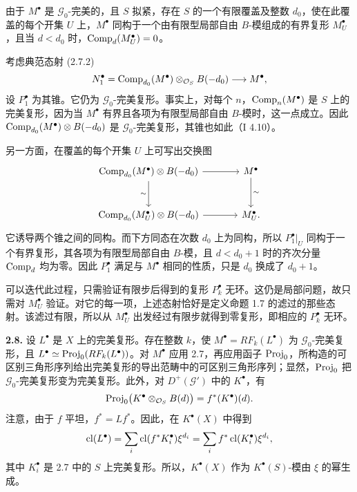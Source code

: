 由于 \(M^\bullet\) 是 \(\mathcal G_0\)-完美的，且 \(S\) 拟紧，存在 \(S\) 的一个有限覆盖及整数 \(d_0\)，使在此覆盖的每个开集 \(U\) 上，\(M^\bullet\) 同构于一个由有限型局部自由 \(B\)-模组成的有界复形 \(M_U^\bullet\)，且当 \(d<d_0\) 时，\(\operatorname{Comp}_d(M_U^\bullet)=0\)。

考虑典范态射 (2.7.2)
\[
 N_1^\bullet=\operatorname{Comp}_{d_0}(M^\bullet)\otimes_{\mathcal O_S}B(-d_0)
 \longrightarrow M^\bullet,
\]
设 \(P_1^\bullet\) 为其锥。它仍为 \(\mathcal G_0\)-完美复形。事实上，对每个 \(n\)，\(\operatorname{Comp}_n(M^\bullet)\) 是 \(S\) 上的完美复形，因为当 \(M^\bullet\) 有界且各项为有限型局部自由 \(B\)-模时，这一点成立。因此 \(\operatorname{Comp}_{d_0}(M^\bullet)\otimes B(-d_0)\) 是 \(\mathcal G_0\)-完美复形，其锥也如此（I 4.10）。

另一方面，在覆盖的每个开集 \(U\) 上可写出交换图
\[
\begin{tikzcd}[column sep=large,row sep=large]
 \Comp_{d_0}(M^\bullet)\otimes B(-d_0) \arrow[r] \arrow[d,"\sim"'] &
 M^\bullet \arrow[d,"\sim"]\\
 \Comp_{d_0}(M_U^\bullet)\otimes B(-d_0) \arrow[r] & M_U^\bullet.
\end{tikzcd}
\]
它诱导两个锥之间的同构。而下方同态在次数 \(d_0\) 上为同构，所以 \(P_1^\bullet|_U\) 同构于一个有界复形，其各项为有限型局部自由 \(B\)-模，且 \(d<d_0+1\) 时的齐次分量 \(\operatorname{Comp}_d\) 均为零。因此 \(P_1^\bullet\) 满足与 \(M^\bullet\) 相同的性质，只是 \(d_0\) 换成了 \(d_0+1\)。

可以迭代此过程，只需验证有限步后得到的复形 \(P_k^\bullet\) 无环。这仍是局部问题，故只需对 \(M_U^\bullet\) 验证。对它的每一项，上述态射恰好是定义命题 1.7 的滤过的那些态射。该滤过有限，所以从 \(M_U^\bullet\) 出发经过有限步就得到零复形，即相应的 \(P_k^\bullet\) 无环。

\noindent\textbf{2.8.}
设 \(L^\bullet\) 是 \(X\) 上的完美复形。存在整数 \(k\)，使 \(M^\bullet=RF_k(L^\bullet)\) 为 \(\mathcal G_0\)-完美复形，且 \(L^\bullet\simeq\operatorname{Proj}_0(RF_k(L^\bullet))\)。对 \(M^\bullet\) 应用 2.7，再应用函子 \(\operatorname{Proj}_0\)，所构造的可区别三角形序列给出完美复形的导出范畴中的可区别三角形序列；显然，\(\operatorname{Proj}_0\) 把 \(\mathcal G_0\)-完美复形变为完美复形。此外，对 \(D^+(\mathcal G')\) 中的 \(K^\bullet\)，有
\[
 \operatorname{Proj}_0\bigl(K^\bullet\otimes_{\mathcal O_S}B(d)\bigr)=f^*(K^\bullet)(d).
\]
注意，由于 \(f\) 平坦，\(f^*=Lf^*\)。因此，在 \(K^\bullet(X)\) 中得到
\[
 \operatorname{cl}(L^\bullet)=\sum_i\operatorname{cl}(f^*K_i^\bullet)\xi^{d_i}
              =\sum_i f^*\operatorname{cl}(K_i^\bullet)\xi^{d_i},
\]
其中 \(K_i^\bullet\) 是 2.7 中的 \(S\) 上完美复形。所以，\(K^\bullet(X)\) 作为 \(K^\bullet(S)\)-模由 \(\xi\) 的幂生成。

